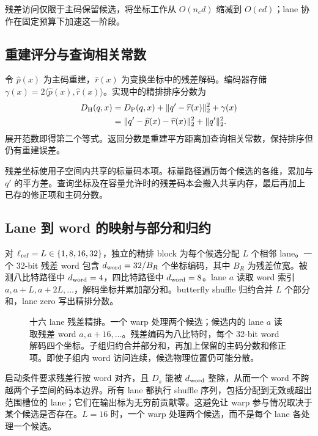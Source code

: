 残差访问仅限于主码保留候选，将坐标工作从 $O(n_cd)$ 缩减到 $O(cd)$；lane 协作在固定预算下加速这一阶段。

\subsection{重建评分与查询相关常数}

令 $\widehat p(x)$ 为主码重建，$\widehat r(x)$ 为变换坐标中的残差解码。编码器存储 $\gamma(x)=2\langle\widehat p(x),\widehat r(x)\rangle$。实现中的精排排序分数为
\begin{align}
 D_{\mathrm{H}}(q,x)
 &=D_{\mathrm{P}}(q,x)+\|q'-\widehat r(x)\|_2^2+\gamma(x)
 \label{eq:5-refined-score}\\
 &=\|q'-\widehat p(x)-\widehat r(x)\|_2^2+\|q'\|_2^2.
 \label{eq:5-refined-constant}
\end{align}
展开范数即得第二个等式。返回分数是重建平方距离加查询相关常数，保持排序但仍有重建误差\cite{jhq}。

残差坐标使用子空间内共享的标量码本项。标量路径遍历每个候选的各维，累加与 $q'$ 的平方差。查询坐标及在容量允许时的残差码本会搬入共享内存，最后再加上已存的修正项和主码分数。

\subsection{Lane 到 word 的映射与部分和归约}

对 $\ell_{\mathrm{ref}}=L\in\{1,8,16,32\}$，独立的精排 block 为每个候选分配 $L$ 个相邻 lane。一个 32-bit 残差 word 包含 $d_{\rm word}=32/B_R$ 个坐标编码，其中 $B_R$ 为残差位宽。被测八比特路径中 $d_{\rm word}=4$，四比特路径中 $d_{\rm word}=8$。lane $a$ 读取 word 索引 $a,a+L,a+2L,\ldots$，解码坐标并累加部分和。butterfly shuffle 归约合并 $L$ 个部分和，lane zero 写出精排分数。

\begin{figure}[tbp]
\centering

\caption[十六 lane 残差精排]{十六 lane 残差精排。一个 warp 处理两个候选；候选内的 lane $a$ 读取残差 word $a,a+16,\ldots$。残差编码为八比特时，每个 32-bit word 解码四个坐标。子组归约合并部分和，再加上保留的主码分数和修正项。即使子组内 word 访问连续，候选物理位置仍可能分散。}
\label{fig:5-lane-refinement}
\end{figure}

启动条件要求残差行按 word 对齐，且 $D_s$ 能被 $d_{\rm word}$ 整除，从而一个 word 不跨越两个子空间的码本边界。所有 lane 都执行 shuffle 序列，包括分配到无效或超出范围槽位的 lane；它们在输出标为无穷前贡献零。这避免让 warp 参与情况取决于某个候选是否存在。$L=16$ 时，一个 warp 处理两个候选，而不是每个 lane 各处理一个候选。

